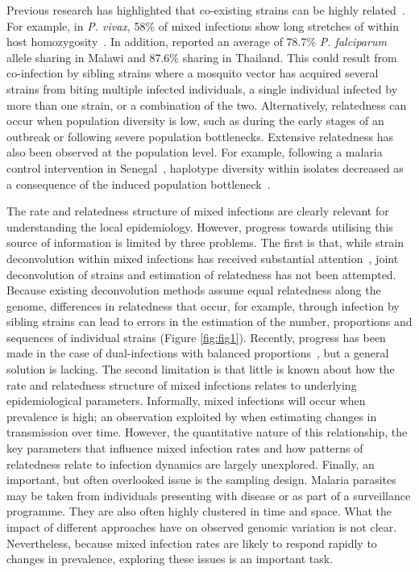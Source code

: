 \documentclass[9pt,lineno]{elife}
\begin{document}
Previous research has highlighted that co-existing strains can be highly related~\citep{Nair2014, Trevino2017}.  For example, in {\it P. vivax}, 58\% of mixed infections show long stretches of within host homozygosity~\citep{Pearson2016}. In addition, \citet{Nkhoma2012} reported an average of 78.7\% {\it P. falciparum} allele sharing in Malawi and 87.6\% sharing in Thailand. This could result from co-infection by sibling strains where a mosquito vector has acquired several strains from biting multiple infected individuals, a single individual infected by more than one strain, or a combination of the two.  Alternatively, relatedness can occur when population diversity is low, such as during the early stages of an outbreak or following severe population bottlenecks. Extensive relatedness has also been observed at the population level.  For example, following a malaria control intervention in Senegal~\citep{Mouzin2010}, haplotype diversity within isolates decreased as a consequence of the induced population bottleneck~\citep{Wong2017}.

The rate and relatedness structure of mixed infections are clearly relevant for understanding the local epidemiology.  However, progress towards utilising this source of information is limited by three problems.  The first is that, while strain deconvolution within mixed infections has received substantial attention~\citep{Galinsky2015, Jack2016, Chang2017, Zhu2017}, joint deconvolution of strains and estimation of relatedness has not been attempted.  Because existing deconvolution methods assume equal relatedness along the genome, differences in relatedness that occur, for example, through infection by sibling strains can lead to errors in the estimation of the number, proportions and sequences of individual strains (Figure \ref{fig:fig1}).  Recently, progress has been made in the case of dual-infections with balanced proportions~\citep{Henden2016}, but a general solution is lacking.  The second limitation is that little is known about how the rate and relatedness structure of mixed infections relates to underlying epidemiological parameters.  Informally, mixed infections will occur when prevalence is high; an observation exploited by \citet{Cerqueira2017} when estimating changes in transmission over time.  However, the quantitative nature of this relationship, the key parameters that influence mixed infection rates and how patterns of relatedness relate to infection dynamics are largely unexplored.  Finally, an important, but often overlooked issue is the sampling design.  Malaria parasites may be taken from individuals presenting with disease or as part of a surveillance programme.  They are also often highly clustered in time and space.  What the impact of different approaches have on observed genomic variation is not clear.  Nevertheless, because mixed infection rates are likely to respond rapidly to changes in prevalence, exploring these issues is an important task.
\end{document}
